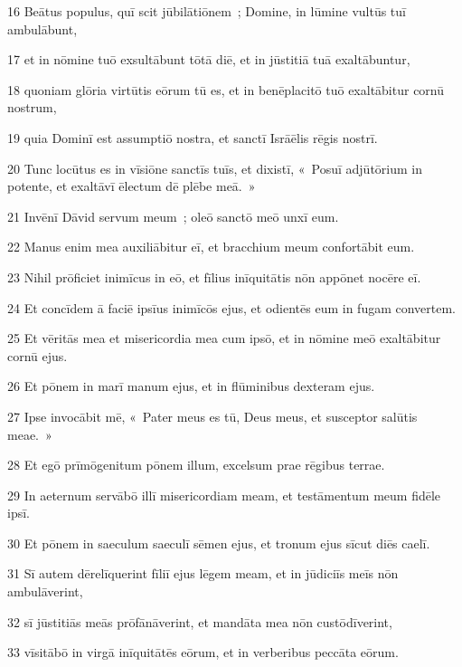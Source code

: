 \psalmVerse
  {\phantom{0}16}
  {Beātus populus, quī scit jūbilātiōnem~; Domine, in lūmine vultūs tuī ambulābunt,}


\psalmVerse
  {\phantom{0}17}
  {et in nōmine tuō exsultābunt tōtā diē, et in jūstitiā tuā exaltābuntur,}


\psalmVerse
  {\phantom{0}18}
  {quoniam glōria virtūtis eōrum tū es, et in benēplacitō tuō exaltābitur cornū nostrum,}


\psalmVerse
  {\phantom{0}19}
  {quia Dominī est assumptiō nostra, et sanctī Isrāēlis rēgis nostrī.}


\psalmVerse
  {\phantom{0}20}
  {Tunc locūtus es in vīsiōne sanctīs tuīs, et dixistī, «~Posuī adjūtōrium in potente, et exaltāvī ēlectum dē plēbe meā.~»}


\psalmVerse
  {\phantom{0}21}
  {Invēnī Dāvid servum meum~; oleō sanctō meō unxī eum.}


\psalmVerse
  {\phantom{0}22}
  {Manus enim mea auxiliābitur eī, et bracchium meum confortābit eum.}


\psalmVerse
  {\phantom{0}23}
  {Nihil prōficiet inimīcus in eō, et fīlius inīquitātis nōn appōnet nocēre eī.}


\psalmVerse
  {\phantom{0}24}
  {Et concīdem ā faciē ipsīus inimīcōs ejus, et odientēs eum in fugam convertem.}


\psalmVerse
  {\phantom{0}25}
  {Et vēritās mea et misericordia mea cum ipsō, et in nōmine meō exaltābitur cornū ejus.}


\psalmVerse
  {\phantom{0}26}
  {Et pōnem in marī manum ejus, et in flūminibus dexteram ejus.}


\psalmVerse
  {\phantom{0}27}
  {Ipse invocābit mē, «~Pater meus es tū, Deus meus, et susceptor salūtis meae.~»}


\psalmVerse
  {\phantom{0}28}
  {Et egō prīmōgenitum pōnem illum, excelsum prae rēgibus terrae.}


\psalmVerse
  {\phantom{0}29}
  {In aeternum servābō illī misericordiam meam, et testāmentum meum fidēle ipsī.}


\psalmVerse
  {\phantom{0}30}
  {Et pōnem in saeculum saeculī sēmen ejus, et tronum ejus sīcut diēs caelī.}


\psalmVerse
  {\phantom{0}31}
  {Sī autem dērelīquerint fīliī ejus lēgem meam, et in jūdiciīs meīs nōn ambulāverint,}


\psalmVerse
  {\phantom{0}32}
  {sī jūstitiās meās prōfānāverint, et mandāta mea nōn custōdīverint,}


\psalmVerse
  {\phantom{0}33}
  {vīsitābō in virgā inīquitātēs eōrum, et in verberibus peccāta eōrum.}


